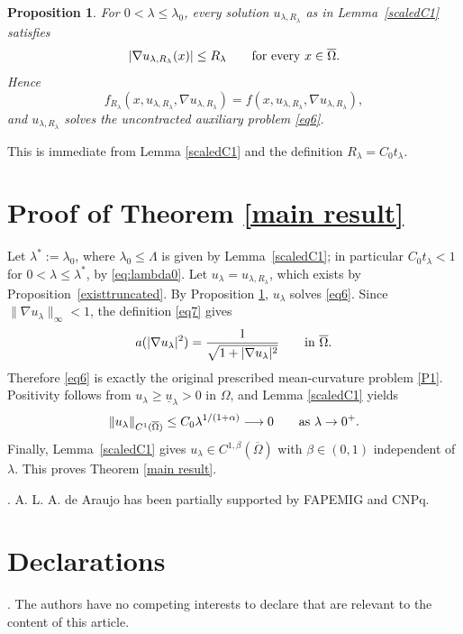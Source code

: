 \documentclass[11pt,leqno]{amsart}
\makeatletter
\newtheorem{proposition}[theorem]{Proposition}
\renewenvironment{proof}[1][\proofname]{%
  \par
  \pushQED{\qed}%
  \normalfont
  \topsep6\p@\@plus6\p@\relax
  \trivlist
  \item[\hskip\labelsep\itshape #1\@addpunct{.}]%
  \hspace{0.5em}\ignorespaces
}{%
  \popQED
  \endtrivlist\@endpefalse
}
\makeatother
\begin{document}
\begin{proposition}\label{decontract}
For $0<\lambda\le\lambda_0$, every solution
$u_{\lambda,R_\lambda}$ as in Lemma~\ref{scaledC1} satisfies
\[
|\nabla u_{\lambda,R_\lambda}(x)|\le R_\lambda
\qquad\hbox{for every }x\in\overline\Omega.
\]
Hence
\[
f_{R_\lambda}(x,u_{\lambda,R_\lambda},
\nabla u_{\lambda,R_\lambda})
=
f(x,u_{\lambda,R_\lambda},\nabla u_{\lambda,R_\lambda}),
\]
and $u_{\lambda,R_\lambda}$ solves the uncontracted auxiliary problem
\eqref{eq6}.
\end{proposition}

\begin{proof}
This is immediate from Lemma \ref{scaledC1} and the definition
$R_\lambda=C_0t_\lambda$.
\end{proof}

\section{Proof of Theorem \ref{main result}}

\begin{proof}

Let $\lambda^*:=\lambda_0$, where $\lambda_0\le\Lambda$ is given by
Lemma~\ref{scaledC1}; in particular $C_0t_\lambda<1$ for
$0<\lambda\le\lambda^*$, by \eqref{eq:lambda0}.
Let $u_\lambda=u_{\lambda,R_\lambda}$, which exists by
Proposition~\ref{existtruncated}.  By Proposition
\ref{decontract}, $u_\lambda$ solves \eqref{eq6}.  Since
$\|\nabla u_\lambda\|_\infty<1$, the definition \eqref{eq7} gives
\[
a(|\nabla u_\lambda|^2)
=\frac{1}{\sqrt{1+|\nabla u_\lambda|^2}}
\qquad\hbox{in }\overline\Omega.
\]
Therefore \eqref{eq6} is exactly the original prescribed mean-curvature
problem \eqref{P1}.  Positivity follows from
$u_\lambda\ge\underline u_\lambda>0$ in $\Omega$, and Lemma
\ref{scaledC1} yields
\[
\|u_\lambda\|_{C^1(\overline\Omega)}
\le C_0\lambda^{1/(1+\alpha)}\longrightarrow0
\qquad\hbox{as }\lambda\to0^+.
\]
Finally, Lemma~\ref{scaledC1} gives
$u_\lambda\in C^{1,\beta}(\overline\Omega)$ with $\beta\in(0,1)$
independent of $\lambda$.  This proves Theorem
\ref{main result}.
\end{proof}


. A. L. A. de Araujo has been partially supported by FAPEMIG and CNPq.

\vspace{0.5cm}

\section*{Declarations}
. The authors have no competing interests to declare that are relevant to the content of
this article.
\end{document}
